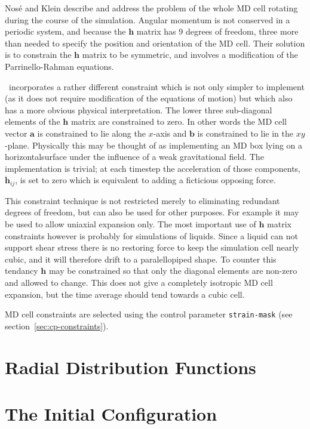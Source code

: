 Nos\'{e} and Klein\cite{nose:83} describe and address the problem of
the whole MD cell rotating during the course of the simulation.
Angular momentum is not conserved in a periodic system, and because
the $\bm{h}$ matrix has 9 degrees of freedom, three more than needed
to specify the position and orientation of the MD cell.  Their
solution is to constrain the $\bm{h}$ matrix to be symmetric, and
involves a modification of the Parrinello-Rahman equations.

\moldy\ incorporates a rather different constraint which is not only
simpler to implement (as it does not require modification of the
equations of motion) but which also has a more obvious physical
interpretation.  The lower three sub-diagonal elements of the $\bm{h}$
matrix are constrained to zero.  In other words the MD cell vector
$\bm{a}$ is constrained to lie along the $x$-axis and $\bm{b}$ is
constrained to lie in the $xy$-plane.  Physically this may be thought
of as implementing an MD box lying on a horizontalsurface under the
influence of a weak gravitational field.  The implementation is
trivial; at each timestep the acceleration of those components,
$\ddot{\bm{h}}_{ij}$, is set to zero which is equivalent to adding a
ficticious opposing force.

This constraint technique is not restricted merely to eliminating
redundant degrees of freedom, but can also be used for other purposes.
For example it may be used to allow uniaxial expansion only.  The most
important use of $\bm{h}$ matrix constraints however is probably for
simulations of liquids.  Since a liquid can not support shear stress
there is no restoring force to keep the simulation cell nearly cubic,
and it will therefore drift to a paralellopiped shape.  To counter
this tendancy $\bm{h}$ may be constrained so that only the diagonal
elements are non-zero and allowed to change.  This does not give a
completely isotropic MD cell expansion, but the time average should
tend towards a cubic cell.

MD cell constraints are selected using the control parameter
\verb'strain-mask' (see section~\ref{sec:cp-constraints}).

\section{Radial Distribution Functions}
\section{The Initial Configuration}
\label{sec:skewstart}
